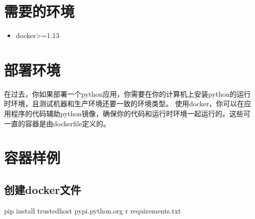 \documentclass[letterpaper,10pt,english]{sphinxmanual}
\begin{document}
\section{需要的环境}
\label{\detokenize{_u5feb_u901f_u5165_u95e8/02-_u5bb9_u5668:id2}}\begin{itemize}
\item {} 
docker\textgreater{}=1.13

\end{itemize}


\section{部署环境}
\label{\detokenize{_u5feb_u901f_u5165_u95e8/02-_u5bb9_u5668:id3}}
在过去，你如果部署一个python应用，你需要在你的计算机上安装python的运行时环境，且测试机器和生产环境还要一致的环境类型。
使用docker，你可以在应用程序的代码辅助python镜像，确保你的代码和运行时环境一起运行的。这些可一直的容器是由dockerfile定义的。


\section{容器样例}
\label{\detokenize{_u5feb_u901f_u5165_u95e8/02-_u5bb9_u5668:id4}}

\subsection{创建docker文件}
\label{\detokenize{_u5feb_u901f_u5165_u95e8/02-_u5bb9_u5668:docker}}
%
\begin{sphinxVerbatim}[commandchars=\\\{\}]



 pip install \PYGZhy{}\PYGZhy{}trusted\PYGZhy{}host pypi.python.org \PYGZhy{}r requirements.txt



\end{sphinxVerbatim}
\end{document}
